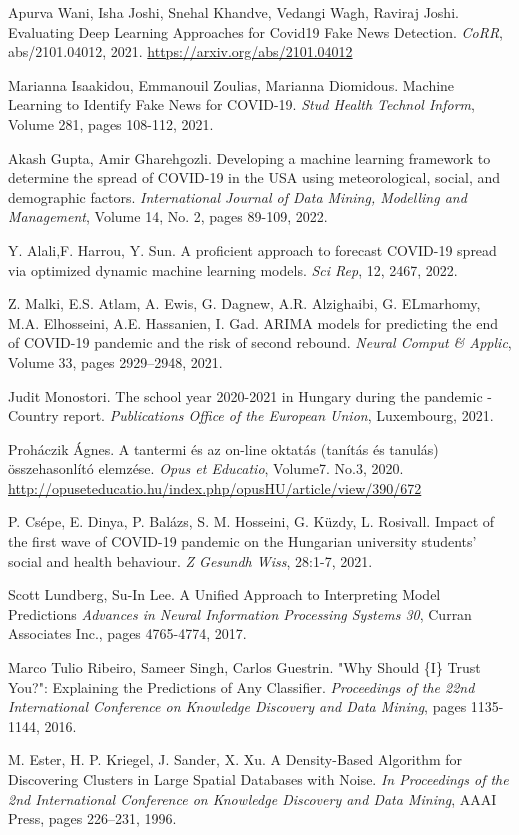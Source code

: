 \documentclass[12pt]{article}
\begin{document}
\begin{thebibliography}{9}
 Apurva Wani, Isha Joshi, Snehal Khandve, Vedangi Wagh, Raviraj Joshi. Evaluating Deep Learning Approaches for Covid19 Fake News Detection. \textit{CoRR}, abs/2101.04012, 2021. \href{https://arxiv.org/abs/2101.04012}{https://arxiv.org/abs/2101.04012}

 Marianna Isaakidou, Emmanouil Zoulias, Marianna Diomidous. Machine Learning to Identify Fake News for COVID-19. \textit{Stud Health Technol Inform}, Volume 281, pages 108-112, 2021.

Akash Gupta, Amir Gharehgozli. Developing a machine learning framework to determine the spread of COVID-19 in the USA using meteorological, social, and demographic factors. \textit{International Journal of Data Mining, Modelling and Management}, Volume 14, No. 2, pages 89-109, 2022.

Y. Alali,F. Harrou, Y. Sun. A proficient approach to forecast COVID-19 spread via optimized dynamic machine learning models. \textit{Sci Rep}, 12, 2467, 2022.

Z. Malki, E.S. Atlam, A. Ewis, G. Dagnew, A.R. Alzighaibi, G. ELmarhomy, M.A. Elhosseini, A.E. Hassanien, I. Gad.
ARIMA models for predicting the end of COVID-19 pandemic and the risk of second rebound. \textit{Neural Comput \& Applic}, Volume 33, pages 2929–2948, 2021.

 Judit Monostori. The school year 2020-2021 in Hungary during the pandemic - Country report. \textit{Publications Office of the European Union}, Luxembourg, 2021.

 Proháczik Ágnes. A tantermi és az on-line oktatás (tanítás és tanulás) összehasonlító elemzése. \textit{Opus et Educatio}, Volume7. No.3, 2020. \url{http://opuseteducatio.hu/index.php/opusHU/article/view/390/672}

P. Csépe, E. Dinya, P. Balázs, S. M. Hosseini, G. Küzdy, L. Rosivall. Impact of the first wave of COVID-19 pandemic on the Hungarian university students' social and health behaviour. \textit{Z Gesundh Wiss},  28:1-7, 2021.

Scott Lundberg, Su-In Lee. A Unified Approach to Interpreting Model Predictions \textit{Advances in Neural Information Processing Systems 30}, Curran Associates Inc., pages 4765-4774, 2017.

Marco Tulio Ribeiro, Sameer Singh, Carlos Guestrin. "Why Should \{I\} Trust You?": Explaining the Predictions of Any Classifier. \textit{Proceedings of the 22nd International Conference on Knowledge Discovery and Data Mining}, pages 1135-1144, 2016.

M. Ester, H. P. Kriegel, J. Sander, X. Xu. A Density-Based Algorithm for Discovering Clusters in Large Spatial Databases with Noise. \textit{In Proceedings of the 2nd International Conference on Knowledge Discovery and Data Mining}, AAAI Press, pages 226–231, 1996.

\end{thebibliography}
\end{document}
